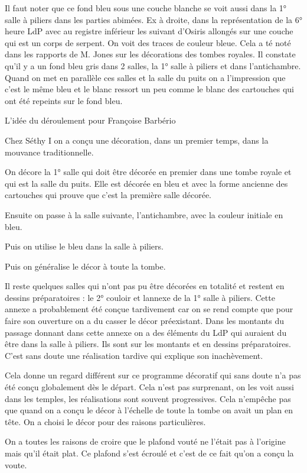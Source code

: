 \documentclass{article}
\begin{document}
Il faut noter que ce fond bleu sous une couche blanche se voit aussi
dans la 1° salle à piliers dans les parties abimées. Ex à droite, dans
la représentation de la 6° heure LdP avec au registre inférieur les
suivant d’Osiris allongés sur une couche qui est un corps de serpent.
On voit des traces de couleur bleue. Cela a té noté dans les rapports
de M. Jones sur les décorations des tombes royales. Il constate qu’il y
a un fond bleu gris dans 2 salles, la 1° salle à piliers et dans
l’antichambre. Quand on met en parallèle ces salles et la salle du
puits on a l’impression que c’est le même bleu et le blanc ressort un
peu comme le blanc des cartouches qui ont été repeints sur le fond
bleu.

L’idée du déroulement pour Françoise Barbério 

Chez Séthy I on a conçu une décoration, dans un premier temps, dans la
mouvance traditionnelle. 

On décore la 1° salle qui doit être décorée en premier dans une tombe
royale et qui est la salle du puits. Elle est décorée en bleu et avec
la forme ancienne des cartouches qui prouve que c’est la première salle
décorée.

Ensuite on passe à la salle suivante, l’antichambre, avec la couleur
initiale en bleu.

Puis on utilise le bleu dans la salle à piliers.

Puis on généralise le décor à toute la tombe. 

Il reste quelques salles qui n’ont pas pu être décorées en totalité et
restent en dessins préparatoires : le 2° couloir et
l{\textquotesingle}annexe de la 1° salle à piliers. Cette annexe a
probablement été conçue tardivement car on se rend compte que pour
faire son ouverture on a du casser le décor préexistant. Dans les
montants du passage donnant dans cette annexe on a des éléments du LdP
qui auraient du être dans la salle à piliers. Ils sont sur les montants
et en dessins préparatoires. C’est sans doute une réalisation tardive
qui explique son inachèvement.

Cela donne un regard différent sur ce programme décoratif qui sans doute
n’a pas été conçu globalement dès le départ. Cela n’est pas surprenant,
on les voit aussi dans les temples, les réalisations sont souvent
progressives. Cela n’empêche pas que quand on a conçu le décor à
l’échelle de toute la tombe on avait un plan en tête. On a choisi le
décor pour des raisons particulières.

On a toutes les raisons de croire que le plafond vouté ne l’était pas à
l’origine mais qu’il était plat. Ce plafond s’est écroulé et c’est de
ce fait qu’on a conçu la voute. 
\end{document}
